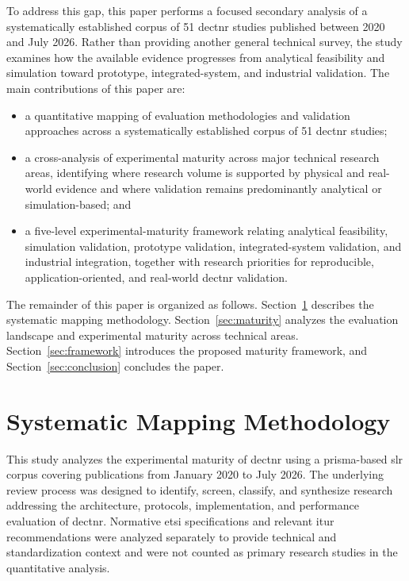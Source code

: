 \documentclass[conference]{IEEEtran}
\begin{document}
To address this gap, this paper performs a focused secondary analysis
of a systematically established corpus of 51 \gls{dectnr} studies
published between 2020 and July 2026. Rather than providing another
general technical survey, the study examines how the available
evidence progresses from analytical feasibility and simulation toward
prototype, integrated-system, and industrial validation. The main
contributions of this paper are:

\begin{itemize}
    \item a quantitative mapping of evaluation methodologies and
    validation approaches across a systematically established corpus
    of 51 \gls{dectnr} studies;

    \item a cross-analysis of experimental maturity across major
    technical research areas, identifying where research volume is
    supported by physical and real-world evidence and where validation
    remains predominantly analytical or simulation-based; and

    \item a five-level experimental-maturity framework relating
    analytical feasibility, simulation validation, prototype
    validation, integrated-system validation, and industrial
    integration, together with research priorities for reproducible,
    application-oriented, and real-world \gls{dectnr} validation.
\end{itemize}

The remainder of this paper is organized as follows.
Section~\ref{sec:methodology} describes the systematic mapping
methodology. Section~\ref{sec:maturity} analyzes the evaluation
landscape and experimental maturity across technical areas.
Section~\ref{sec:framework} introduces the proposed maturity
framework, and Section~\ref{sec:conclusion} concludes the paper.


\section{Systematic Mapping Methodology}
\label{sec:methodology}

This study analyzes the experimental maturity of \gls{dectnr} using
a \gls{prisma}-based \gls{slr} corpus covering publications from
January 2020 to July 2026. The underlying review process was designed
to identify, screen, classify, and synthesize research addressing the
architecture, protocols, implementation, and performance evaluation of
\gls{dectnr}. Normative \gls{etsi} specifications and relevant
\gls{itur} recommendations were analyzed separately to provide
technical and standardization context and were not counted as primary
research studies in the quantitative analysis.
\end{document}
